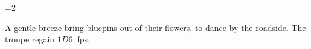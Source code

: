 

\ifnum\value{temperature}=2

  A gentle breeze bring bluepins out of their flowers, to dance by the roadside.
  The troupe regain $1D6$~\glspl{fp}.

\fi

